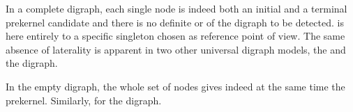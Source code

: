\documentclass[a4paper,12pt,english]{sphinxhowto}
\begin{document}
\sphinxAtStartPar
In a complete digraph, each single node is indeed both an initial and a terminal prekernel candidate and there is no definite  or  of the digraph to be detected.  is here entirely  to a specific singleton chosen as reference point of view. The same absence of laterality is apparent in two other universal digraph models, the  and the  digraph.

\begin{sphinxVerbatim}[commandchars=\\\{\},numbers=left,firstnumber=1,stepnumber=1]
  
\end{sphinxVerbatim}

\sphinxAtStartPar
In the empty digraph, the whole set of nodes gives indeed at the same time the     prekernel. Similarly, for the  digraph.
\end{document}
